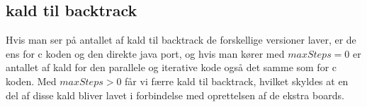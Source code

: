 \subsection{kald til backtrack}
Hvis man ser på antallet af kald til backtrack de forskellige versioner laver, er de
ens for c koden og den direkte java port, og hvis man kører med $maxSteps=0$ er
antallet af kald for den parallele og iterative kode også det samme som
for c koden. Med $maxSteps>0$ får vi færre kald til backtrack, hvilket skyldes
at en del af disse kald bliver lavet i forbindelse med oprettelsen af de ekstra
boards. 
